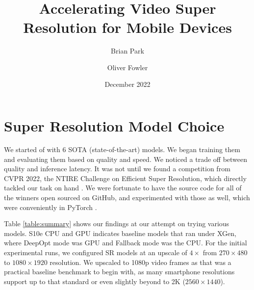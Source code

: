 \documentclass{article}
\title{Accelerating Video Super Resolution for Mobile Devices}
\author{Brian Park}
\author{Oliver Fowler}
\affil{North Carolina State University, Computer Science 591/791-025}
\date{December 2022}
\begin{document}

\maketitle

\section{Super Resolution Model Choice}

We started of with 6 SOTA (state-of-the-art) models. We began training them and evaluating them based on quality and speed. We noticed a trade off between quality and inference latency. It was not until we found a competition from CVPR 2022, the NTIRE Challenge on Efficient Super Resolution, which directly tackled our task on hand \cite{ntire22}. We were fortunate to have the source code for all of the winners open sourced on GitHub, and experimented with those as well, which were conveniently in PyTorch \cite{ntire22-github}.

Table \ref{table:summary} shows our findings at our attempt on trying various models. S10e CPU and GPU indicates baseline models that ran under XGen, where DeepOpt mode was GPU and Fallback mode was the CPU. For the initial experimental runs, we configured SR models at an upscale of $4\times$ from $270 \times 480$ to $1080 \times 1920$ resolution. We upscaled to 1080p video frames as that was a practical baseline benchmark to begin with, as many smartphone resolutions support up to that standard or even slightly beyond to 2K ($2560 \times 1440$).
\end{document}
